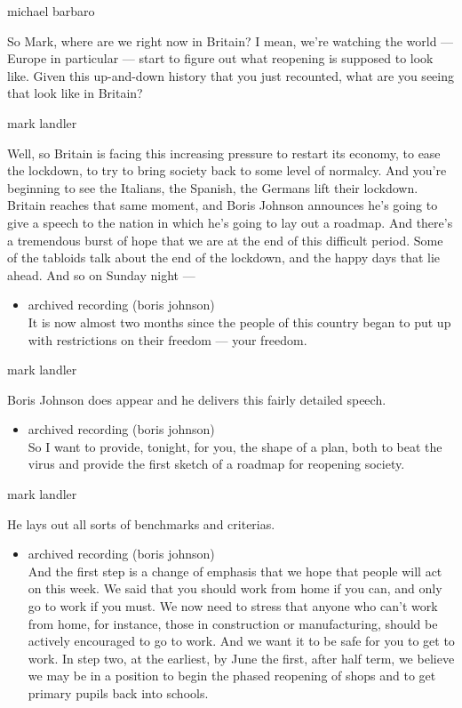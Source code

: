 michael barbaro

So Mark, where are we right now in Britain? I mean, we're watching the
world --- Europe in particular --- start to figure out what reopening is
supposed to look like. Given this up-and-down history that you just
recounted, what are you seeing that look like in Britain?

mark landler

Well, so Britain is facing this increasing pressure to restart its
economy, to ease the lockdown, to try to bring society back to some
level of normalcy. And you're beginning to see the Italians, the
Spanish, the Germans lift their lockdown. Britain reaches that same
moment, and Boris Johnson announces he's going to give a speech to the
nation in which he's going to lay out a roadmap. And there's a
tremendous burst of hope that we are at the end of this difficult
period. Some of the tabloids talk about the end of the lockdown, and the
happy days that lie ahead. And so on Sunday night ---

\begin{itemize}
\tightlist
\item
  archived recording (boris johnson)\\
  It is now almost two months since the people of this country began to
  put up with restrictions on their freedom --- your freedom.
\end{itemize}

mark landler

Boris Johnson does appear and he delivers this fairly detailed speech.

\begin{itemize}
\tightlist
\item
  archived recording (boris johnson)\\
  So I want to provide, tonight, for you, the shape of a plan, both to
  beat the virus and provide the first sketch of a roadmap for reopening
  society.
\end{itemize}

mark landler

He lays out all sorts of benchmarks and criterias.

\begin{itemize}
\tightlist
\item
  archived recording (boris johnson)\\
  And the first step is a change of emphasis that we hope that people
  will act on this week. We said that you should work from home if you
  can, and only go to work if you must. We now need to stress that
  anyone who can't work from home, for instance, those in construction
  or manufacturing, should be actively encouraged to go to work. And we
  want it to be safe for you to get to work. In step two, at the
  earliest, by June the first, after half term, we believe we may be in
  a position to begin the phased reopening of shops and to get primary
  pupils back into schools.
\end{itemize}

